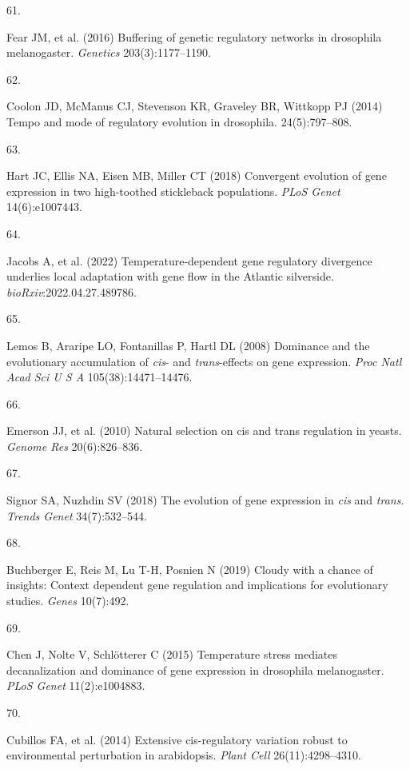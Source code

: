 \documentclass[9pt,twocolumn,twoside,lineno]{pnas-new}
\newlength{\cslhangindent}
\newlength{\csllabelwidth}
\newlength{\cslentryspacingunit} %
\newenvironment{CSLReferences}[2] %
 {%
  \setlength{\parindent}{0pt}
  \ifodd #1
  \let\oldpar\par
  \def\par{\hangindent=\cslhangindent\oldpar}
  \fi
  \setlength{\parskip}{#2\cslentryspacingunit}
 }%
 {}
\newcommand{\CSLLeftMargin}[1]{\parbox[t]{\csllabelwidth}{#1}}
\newcommand{\CSLRightInline}[1]{\parbox[t]{\linewidth - \csllabelwidth}{#1}\break}
\begin{document}
\begin{CSLReferences}{0}{0}
\leavevmode\hypertarget{ref-Fear2016}{}%
\CSLLeftMargin{61. }
\CSLRightInline{Fear JM, et al. (2016) Buffering of genetic regulatory
networks in drosophila melanogaster. \emph{Genetics} 203(3):1177--1190.}

\leavevmode\hypertarget{ref-Coolon2014}{}%
\CSLLeftMargin{62. }
\CSLRightInline{Coolon JD, McManus CJ, Stevenson KR, Graveley BR,
Wittkopp PJ (2014) Tempo and mode of regulatory evolution in drosophila.
24(5):797--808.}

\leavevmode\hypertarget{ref-Hart2018}{}%
\CSLLeftMargin{63. }
\CSLRightInline{Hart JC, Ellis NA, Eisen MB, Miller CT (2018) Convergent
evolution of gene expression in two high-toothed stickleback
populations. \emph{PLoS Genet} 14(6):e1007443.}

\leavevmode\hypertarget{ref-Jacobs2022}{}%
\CSLLeftMargin{64. }
\CSLRightInline{Jacobs A, et al. (2022) Temperature-dependent gene
regulatory divergence underlies local adaptation with gene flow in the
{Atlantic} silverside. \emph{bioRxiv}:2022.04.27.489786.}

\leavevmode\hypertarget{ref-Lemos2008}{}%
\CSLLeftMargin{65. }
\CSLRightInline{Lemos B, Araripe LO, Fontanillas P, Hartl DL (2008)
Dominance and the evolutionary accumulation of \emph{cis}- and
\emph{trans}-effects on gene expression. \emph{Proc Natl Acad Sci U S A}
105(38):14471--14476.}

\leavevmode\hypertarget{ref-Emerson2010}{}%
\CSLLeftMargin{66. }
\CSLRightInline{Emerson JJ, et al. (2010) Natural selection on cis and
trans regulation in yeasts. \emph{Genome Res} 20(6):826--836.}

\leavevmode\hypertarget{ref-Signor2018}{}%
\CSLLeftMargin{67. }
\CSLRightInline{Signor SA, Nuzhdin SV (2018) The evolution of gene
expression in \emph{cis} and \emph{trans}. \emph{Trends Genet}
34(7):532--544.}

\leavevmode\hypertarget{ref-Buchberger2019}{}%
\CSLLeftMargin{68. }
\CSLRightInline{Buchberger E, Reis M, Lu T-H, Posnien N (2019) Cloudy
with a chance of insights: Context dependent gene regulation and
implications for evolutionary studies. \emph{Genes} 10(7):492.}

\leavevmode\hypertarget{ref-Chen2015}{}%
\CSLLeftMargin{69. }
\CSLRightInline{Chen J, Nolte V, Schlötterer C (2015) Temperature stress
mediates decanalization and dominance of gene expression in drosophila
melanogaster. \emph{PLoS Genet} 11(2):e1004883.}

\leavevmode\hypertarget{ref-Cubillos2014}{}%
\CSLLeftMargin{70. }
\CSLRightInline{Cubillos FA, et al. (2014) Extensive cis-regulatory
variation robust to environmental perturbation in arabidopsis.
\emph{Plant Cell} 26(11):4298--4310.}


\end{CSLReferences}
\end{document}
